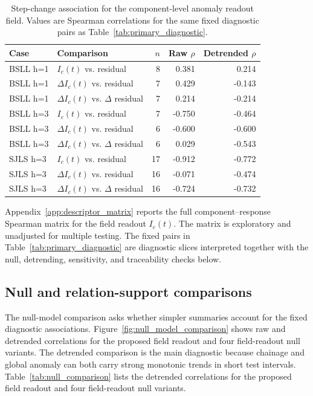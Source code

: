 \begin{table}[htbp]
\centering
\caption{Step-change association for the component-level anomaly readout
field. Values are Spearman correlations for the same fixed diagnostic pairs as
Table~\ref{tab:primary_diagnostic}.}
\label{tab:delta_field_association}
\scriptsize
\setlength{\tabcolsep}{4pt}
\begin{tabular}{llrrr}
\toprule
Case & Comparison & $n$ & Raw $\rho$ & Detrended $\rho$ \\
\midrule
BSLL h=1 & $I_c(t)$ vs. residual & 8 & 0.381 & 0.214 \\
BSLL h=1 & $\Delta I_c(t)$ vs. residual & 7 & 0.429 & -0.143 \\
BSLL h=1 & $\Delta I_c(t)$ vs. $\Delta$ residual & 7 & 0.214 & -0.214 \\
BSLL h=3 & $I_c(t)$ vs. residual & 7 & -0.750 & -0.464 \\
BSLL h=3 & $\Delta I_c(t)$ vs. residual & 6 & -0.600 & -0.600 \\
BSLL h=3 & $\Delta I_c(t)$ vs. $\Delta$ residual & 6 & 0.029 & -0.543 \\
SJLS h=3 & $I_c(t)$ vs. residual & 17 & -0.912 & -0.772 \\
SJLS h=3 & $\Delta I_c(t)$ vs. residual & 16 & -0.071 & -0.474 \\
SJLS h=3 & $\Delta I_c(t)$ vs. $\Delta$ residual & 16 & -0.724 & -0.732 \\
\bottomrule
\end{tabular}
\end{table}

Appendix~\ref{app:descriptor_matrix} reports the full component--response
Spearman matrix for the field readout $I_c(t)$. The matrix is exploratory and
unadjusted for multiple testing. The fixed pairs in
Table~\ref{tab:primary_diagnostic} are diagnostic slices interpreted together
with the null, detrending, sensitivity, and traceability checks below.

\subsection{Null and relation-support comparisons}
\label{sec:null_results}
The null-model comparison asks whether simpler summaries account for the fixed
diagnostic associations. Figure~\ref{fig:null_model_comparison} shows
raw and detrended correlations for the proposed field readout and four
field-readout null variants.
The detrended comparison is the main diagnostic because
chainage and global anomaly can both carry strong monotonic trends in short
test intervals. Table~\ref{tab:null_comparison} lists the detrended
correlations for the proposed field readout and four field-readout null
variants.

